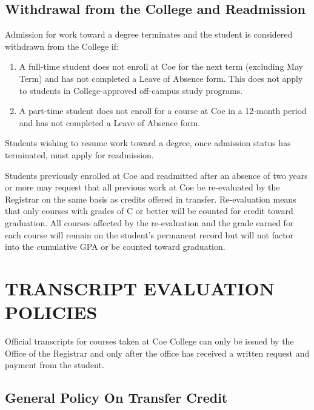 \documentclass[
  letterpaper,
]{scrbook}
\providecommand{\tightlist}{%
  \setlength{\itemsep}{0pt}\setlength{\parskip}{0pt}}
\begin{document}
\hypertarget{withdrawal-from-the-college-and-readmission}{%
\section{Withdrawal from the College and
Readmission}\label{withdrawal-from-the-college-and-readmission}}

Admission for work toward a degree terminates and the student is
considered withdrawn from the College if:

\begin{enumerate}
\def\labelenumi{\arabic{enumi}.}
\tightlist
\item
  A full-time student does not enroll at Coe for the next term
  (excluding May Term) and has not completed a Leave of Absence form.
  This does not apply to students in College-approved off-campus study
  programs.
\item
  A part-time student does not enroll for a course at Coe in a 12-month
  period and has not completed a Leave of Absence form.
\end{enumerate}

Students wishing to resume work toward a degree, once admission status
has terminated, must apply for readmission.

Students previously enrolled at Coe and readmitted after an absence of
two years or more may request that all previous work at Coe be
re-evaluated by the Registrar on the same basis as credits offered in
transfer. Re-evaluation means that only courses with grades of C or
better will be counted for credit toward graduation. All courses
affected by the re-evaluation and the grade earned for each course will
remain on the student's permanent record but will not factor into the
cumulative GPA or be counted toward graduation.

\hypertarget{transcript-evaluation-policies}{%
\chapter{TRANSCRIPT EVALUATION
POLICIES}\label{transcript-evaluation-policies}}

Official transcripts for courses taken at Coe College can only be issued
by the Office of the Registrar and only after the office has received a
written request and payment from the student.

\hypertarget{general-policy-on-transfer-credit}{%
\section{General Policy On Transfer
Credit}\label{general-policy-on-transfer-credit}}
\end{document}
